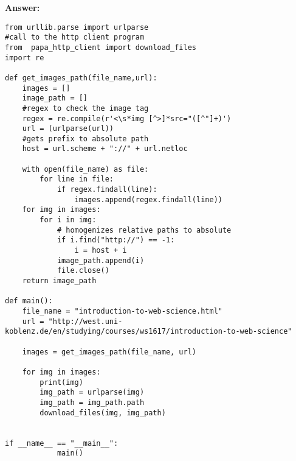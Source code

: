 \documentclass{WeSTassignment}
\begin{document}
\textbf{Answer: } \\

\begin{lstlisting}
from urllib.parse import urlparse
#call to the http client program
from  papa_http_client import download_files
import re

def get_images_path(file_name,url):
    images = []
    image_path = []
    #regex to check the image tag
    regex = re.compile(r'<\s*img [^>]*src="([^"]+)')
    url = (urlparse(url))
    #gets prefix to absolute path
    host = url.scheme + "://" + url.netloc

    with open(file_name) as file:
        for line in file:
            if regex.findall(line):
                images.append(regex.findall(line))
    for img in images:
        for i in img:
            # homogenizes relative paths to absolute
            if i.find("http://") == -1:
                i = host + i
            image_path.append(i)
            file.close()
    return image_path

def main():
    file_name = "introduction-to-web-science.html"
    url = "http://west.uni-koblenz.de/en/studying/courses/ws1617/introduction-to-web-science"

    images = get_images_path(file_name, url)

    for img in images:
        print(img)
        img_path = urlparse(img)
        img_path = img_path.path
        download_files(img, img_path)


if __name__ == "__main__":
            main()
\end{lstlisting}








\makefooter
\end{document}
